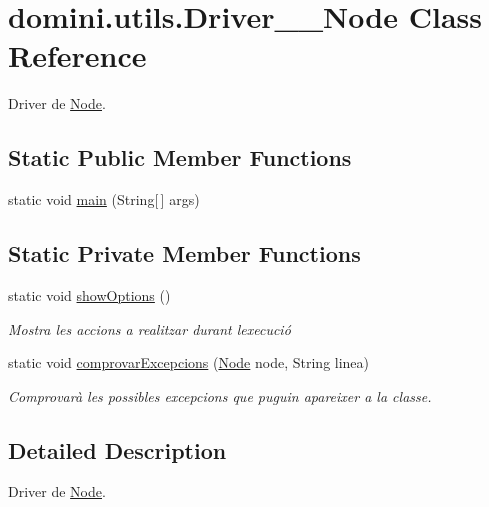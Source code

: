 \hypertarget{classdomini_1_1utils_1_1Driver____Node}{}\section{domini.\+utils.\+Driver\+\_\+\+\_\+\+Node Class Reference}
\label{classdomini_1_1utils_1_1Driver____Node}


Driver de \hyperlink{classdomini_1_1utils_1_1Node}{Node}.  


\subsection*{Static Public Member Functions}
\begin{DoxyCompactItemize}
\item 
static void \hyperlink{classdomini_1_1utils_1_1Driver____Node_abfb5f35b8100dec9d147a79af04df017}{main} (String\mbox{[}$\,$\mbox{]} args)
\end{DoxyCompactItemize}
\subsection*{Static Private Member Functions}
\begin{DoxyCompactItemize}
\item 
static void \hyperlink{classdomini_1_1utils_1_1Driver____Node_a3e1022f470676f7cbbeb44b9b2d4f66f}{show\+Options} ()
\begin{DoxyCompactList}\small\item\em Mostra les accions a realitzar durant l\textquotesingle{}execució \end{DoxyCompactList}\item 
static void \hyperlink{classdomini_1_1utils_1_1Driver____Node_a9fdd311953250227bb70d67cbf20bbb4}{comprovar\+Excepcions} (\hyperlink{classdomini_1_1utils_1_1Node}{Node} node, String linea)
\begin{DoxyCompactList}\small\item\em Comprovarà les possibles excepcions que puguin apareixer a la classe. \end{DoxyCompactList}\end{DoxyCompactItemize}


\subsection{Detailed Description}
Driver de \hyperlink{classdomini_1_1utils_1_1Node}{Node}. 


